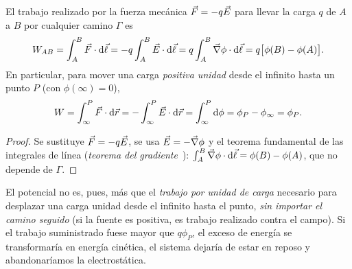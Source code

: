 \begin{proposicion}\label{prop:trabajo}
El trabajo realizado por la fuerza mecánica $\vec{F}=-q\vec{E}$ para llevar la carga $q$ de $A$ a $B$ por cualquier camino $\Gamma$ es
\begin{equation}\label{eq:trabajo}
  W_{AB}=\int_{A}^{B}\vec{F}\cdot\mathrm{d}\vec{\ell}=-q\int_{A}^{B}\vec{E}\cdot\mathrm{d}\vec{\ell}=q\int_{A}^{B}\vec{\nabla}\phi\cdot\mathrm{d}\vec{\ell}=q\bigl[\phi(B)-\phi(A)\bigr].
\end{equation}
En particular, para mover una carga \emph{positiva unidad} desde el infinito hasta un punto $P$ (con $\phi(\infty)=0$),
\begin{equation}\label{eq:trabajo-unidad}
  W=\int_{\infty}^{P}\vec{F}\cdot\mathrm{d}\vec{r}=-\int_{\infty}^{P}\vec{E}\cdot\mathrm{d}\vec{r}=\int_{\infty}^{P}\mathrm{d}\phi=\phi_P-\phi_\infty=\phi_P.
\end{equation}
\end{proposicion}
\begin{proof}
Se sustituye $\vec{F}=-q\vec{E}$, se usa $\vec{E}=-\vec{\nabla}\phi$ y el teorema fundamental de las integrales de línea (\emph{teorema del gradiente}~\cite{TEMA0}):
$\int_A^B\vec{\nabla}\phi\cdot\mathrm{d}\vec{\ell}=\phi(B)-\phi(A)$, que no depende de $\Gamma$.
\end{proof}

El potencial no es, pues, más que el \emph{trabajo por unidad de carga} necesario para desplazar una carga unidad desde el infinito
hasta el punto, \emph{sin importar el camino seguido} (si la fuente es positiva, es trabajo realizado contra el campo). Si el
trabajo suministrado fuese mayor que $q\phi_P$, el exceso de energía se transformaría en energía cinética, el sistema dejaría de estar
en reposo y abandonaríamos la electrostática.

